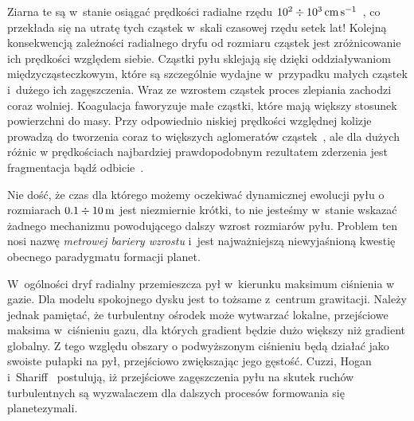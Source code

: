 Ziarna te są w~stanie osiągać prędkości radialne rzędu
$10^2\div10^3\hbox{$\thinspace\textrm{cm}$}\hbox{$\thinspace\textrm{s}$}^{-1}$~\cite{W77}, co przekłada się na utratę
tych cząstek w~skali czasowej rzędu setek lat!  Kolejną konsekwencją zależności
radialnego dryfu od rozmiaru cząstek jest zróżnicowanie ich prędkości względem
siebie. Cząstki pyłu sklejają się dzięki oddziaływaniom międzycząsteczkowym,
które są szczególnie wydajne w~przypadku małych cząstek i~dużego ich
zagęszczenia. Wraz ze wzrostem cząstek proces zlepiania zachodzi coraz wolniej.
Koagulacja faworyzuje małe cząstki, które mają większy stosunek powierzchni do
masy. Przy odpowiednio niskiej prędkości względnej kolizje prowadzą do tworzenia
coraz to większych aglomeratów cząstek~\citep{BW08}, ale dla dużych różnic w
prędkościach najbardziej prawdopodobnym rezultatem zderzenia jest
fragmentacja bądź odbicie~\citep{Z10}. 
\par Nie dość, że czas dla którego możemy oczekiwać dynamicznej ewolucji pyłu o
rozmiarach $0.1 \div 10\hbox{$\thinspace\textrm{m}$}$ jest niezmiernie krótki, to nie jesteśmy w~stanie
wskazać żadnego mechanizmu powodującego dalszy wzrost rozmiarów pyłu. Problem
ten nosi nazwę \emph{metrowej bariery wzrostu} i~jest najważniejszą
niewyjaśnioną kwestię obecnego paradygmatu formacji planet.
\par W~ogólności dryf radialny przemieszcza pył w~kierunku maksimum ciśnienia w
gazie. Dla modelu spokojnego dysku jest to tożsame z~centrum grawitacji. Należy
jednak pamiętać, że turbulentny ośrodek może wytwarzać lokalne, przejściowe
maksima w~ciśnieniu gazu, dla których gradient będzie dużo większy niż gradient
globalny. Z tego względu obszary o podwyższonym ciśnieniu będą działać jako
swoiste pułapki na pył, przejściowo zwiększając jego gęstość. 
Cuzzi, Hogan i~Shariff~\citep{CHS08} postulują, iż przejściowe zagęszczenia
pyłu na skutek ruchów turbulentnych są wyzwalaczem dla dalszych procesów
formowania się planetezymali.
